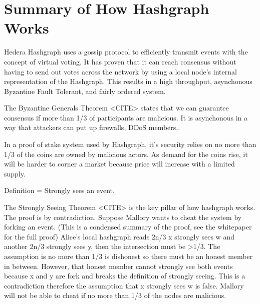 \section{Summary of How Hashgraph Works}

Hedera Hashgraph uses a gossip protocol to efficiently transmit events with the concept of virtual voting. It has proven that it can reach consensus without having to send out votes across the network by using a local node's internal representation of the Hashgraph. This results in a high throughput, asynchonous Byzantine Fault Tolerant, and fairly ordered system.

The Byzantine Generals Theorem <CITE> states that we can guarantee consensus if more than 1/3 of participants are malicious. It is asynchonous in a way that attackers can put up firewalls, DDoS members,.

In a proof of stake system used by Hashgraph, it's security relies on no more than 1/3 of the coins are owned by malicious actors. As demand for the coins rise, it will be harder to corner a market because price will increase with a limited supply.

Definition = Strongly sees an event.


The Strongly Seeing Theorem <CITE> is the key pillar of how hashgraph works. The proof is by contradiction. Suppose Mallory wants to cheat the system by forking an event. (This is a condensed summary of the proof, see the whitepaper for the full proof) Alice's local hashgraph reads 2n/3 x strongly sees w and another 2n/3 strongly sees y, then the intersection must be >1/3. The assumption is no more than 1/3 is dishonest so there must be an honest member in between. However, that honest member cannot strongly see both events because x and y are fork and breaks the definition of strongly seeing. This is a contradiction therefore the assumption that x strongly sees w is false. Mallory will not be able to cheat if no more than 1/3 of the nodes are malicious.
